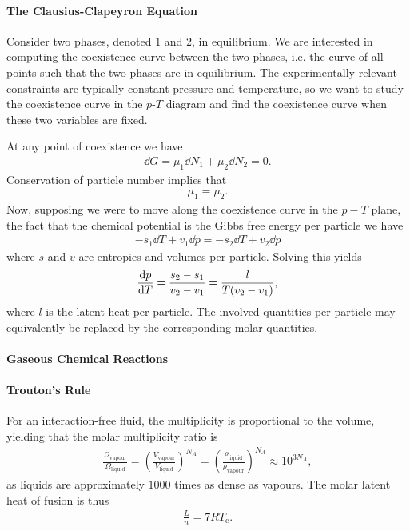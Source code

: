 \paragraph{The Clausius-Clapeyron Equation}
Consider two phases, denoted $1$ and $2$, in equilibrium. We are interested in computing the coexistence curve between the two phases, i.e. the curve of all points such that the two phases are in equilibrium. The experimentally relevant constraints are typically constant pressure and temperature, so we want to study the coexistence curve in the $p$-$T$ diagram and find the coexistence curve when these two variables are fixed.

At any point of coexistence we have
\begin{align*}
\dd{G} = \mu_{1}\dd{N_{1}} + \mu_{2}\dd{N_{2}} = 0.
\end{align*}
Conservation of particle number implies that
\begin{align*}
\mu_{1} = \mu_{2}.
\end{align*}
Now, supposing we were to move along the coexistence curve in the $p-T$ plane, the fact that the chemical potential is the Gibbs free energy per particle we have
\begin{align*}
-s_{1}\dd{T} + v_{1}\dd{p} = -s_{2}\dd{T} + v_{2}\dd{p}
\end{align*}
where $s$ and $v$ are entropies and volumes per particle. Solving this yields
\begin{align*}
\dv{p}{T} = \frac{s_{2} - s_{1}}{v_{2} - v_{1}} = \frac{l}{T(v_{2} - v_{1})},
\end{align*}
where $l$ is the latent heat per particle. The involved quantities per particle may equivalently be replaced by the corresponding molar quantities.

\paragraph{Gaseous Chemical Reactions}

\paragraph{Trouton's Rule}
For an interaction-free fluid, the multiplicity is proportional to the volume, yielding that the molar multiplicity ratio is
\begin{align*}
	\frac{\Omega_{\text{vapour}}}{\Omega_{\text{liquid}}} = \left(\frac{V_{\text{vapour}}}{V_{\text{liquid}}}\right)^{N_{A}} = \left(\frac{\rho_{\text{liquid}}}{\rho_{\text{vapour}}}\right)^{N_{A}} \approx 10^{3N_{A}},
\end{align*}
as liquids are approximately $1000$ times as dense as vapours. The molar latent heat of fusion is thus
\begin{align*}
	\frac{L}{n} = 7RT_{\text{c}}.
\end{align*}